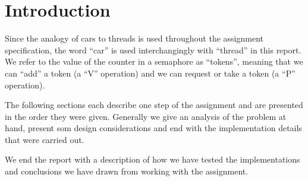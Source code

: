 \section{Introduction}

Since the analogy of cars to threads is used throughout the assignment specification, the word ``car'' is used interchangingly with ``thread'' in this report. We refer to the value of the counter in a semaphore as ``tokens'', meaning that we can ``add'' a token (a ``V'' operation) and we can request or take a token (a ``P'' operation).

The following sections each describe one step of the assignment and are presented in the order they were given. Generally we give an analysis of the problem at hand, present som design considerations and end with the implementation details that were carried out.

We end the report with a description of how we have tested the implementations and conclusions we have drawn from working with the assignment.

